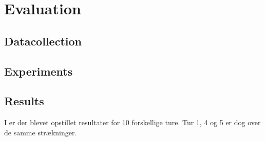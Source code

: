 \chapter{Evaluation}\label{ch:evaluering}


\section{Datacollection}
\label{sec:datacollection}


\section{Experiments}
\label{sec:experiments}


\clearpage
\section{Results}
\label{sec:results}

I  er der blevet opstillet resultater for 10 forskellige ture. Tur 1, 4 og 5 er dog over de samme strækninger.

